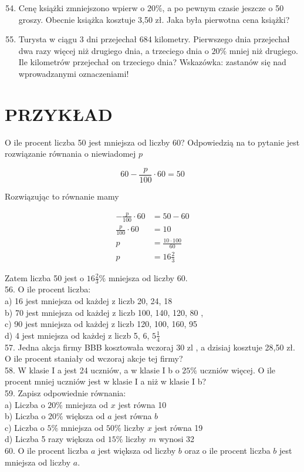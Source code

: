 \documentclass[10pt]{article}
\begin{document}
\begin{enumerate}
  \setcounter{enumi}{53}
  \item Cenę książki zmniejszono wpierw o \(20 \%\), a po pewnym czasie jeszcze o 50 groszy. Obecnie książka kosztuje 3,50 zł. Jaka była pierwotna cena książki?
  \item Turysta w ciągu 3 dni przejechał 684 kilometry. Pierwszego dnia przejechał dwa razy więcej niż drugiego dnia, a trzeciego dnia o \(20 \%\) mniej niż drugiego. Ile kilometrów przejechał on trzeciego dnia? Wskazówka: zastanów się nad wprowadzanymi oznaczeniami!
\end{enumerate}

\section*{PRZYKŁAD}
O ile procent liczba 50 jest mniejsza od liczby 60? Odpowiedzią na to pytanie jest rozwiązanie równania o niewiadomej \(p\)

\[
60-\frac{p}{100} \cdot 60=50
\]

Rozwiązując to równanie mamy

\[
\begin{aligned}
-\frac{p}{100} \cdot 60 & =50-60 \\
\frac{p}{100} \cdot 60 & =10 \\
p & =\frac{10 \cdot 100}{60} \\
p & =16 \frac{2}{3}
\end{aligned}
\]

Zatem liczba 50 jest o \(16 \frac{2}{3} \%\) mniejsza od liczby 60.\\
56. O ile procent liczba:\\
a) 16 jest mniejsza od każdej z liczb 20, 24, 18\\
b) 70 jest mniejsza od każdej z liczb 100, 140, 120, 80 ,\\
c) 90 jest mniejsza od każdej z liczb 120, 100, 160, 95\\
d) 4 jest mniejsza od każdej z liczb 5, 6, \(5 \frac{1}{4}\)\\
57. Jedna akcja firmy BBB kosztowała wczoraj 30 zl , a dzisiaj kosztuje 28,50 zł. O ile procent staniały od wczoraj akcje tej firmy?\\
58. W klasie I a jest 24 uczniów, a w klasie I b o \(25 \%\) uczniów więcej. O ile procent mniej uczniów jest w klasie I a niż w klasie I b?\\
59. Zapisz odpowiednie równania:\\
a) Liczba o \(20 \%\) mniejsza od \(x\) jest równa 10\\
b) Liczba o \(20 \%\) większa od \(a\) jest równa \(b\)\\
c) Liczba o \(5 \%\) mniejsza od \(50 \%\) liczby \(x\) jest równa 19\\
d) Liczba 5 razy większa od \(15 \%\) liczby \(m\) wynosi 32\\
60. O ile procent liczba \(a\) jest większa od liczby \(b\) oraz o ile procent liczba \(b\) jest mniejsza od liczby \(a\).
\end{document}
